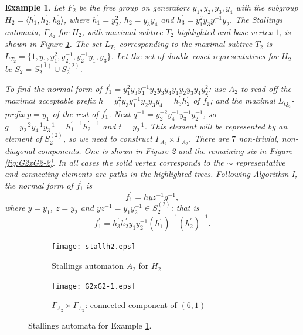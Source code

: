 \documentclass[a4paper,12pt]{article}
\newcommand{\G}{\Gamma }
\newtheorem{exam}[theorem]{Example}
\newenvironment{example}{\begin{exam} \rm}{\end{exam}}
\numberwithin{equation}{section}
\numberwithin{figure}{section}
\newcommand{\la}{\langle}
\newcommand{\ra}{\rangle}
\begin{document}
\begin{example}\label{ex:f_2}
Let $F_2$ be the free group on generators
$y_1,y_2,y_3,y_4$ with the subgroup $H_2 = \la h_1^{\prime},
h_2^{\prime},h_3^{\prime}\ra$, where
$h_1^{\prime}=y_2^2$,
$h_2^{\prime}=y_3y_4$ and
$h_3^{\prime}=y_1^2y_3y_1^{-1}y_2$.
The Stallings automata, $\G_{A_2}$ for $H_2$,
with maximal subtree $T_2$ highlighted and base vertex $1$, is shown
in Figure \ref{fig:stallh2}.
The set $L_{T_2}$ corresponding to the maximal subtree  $T_2$ is
 $L_{T_2}=
\{1, y_1, y_1^2,
y_2^{-1}, y_2^{-1}y_1, y_3 \}$.
Let the set of double coset representatives for $H_2$ be $S_2=S_2^{(1)}
\cup S_2^{(2)}$.

To find the normal form of $f_1^\prime=y_1^2y_3y_1^{-1}y_2y_3y_4y_1y_2
y_3y_4y_2^2$: use ${A_2}$ to read off the maximal acceptable
prefix $h= y_1^2y_3y_1^{-1}y_2y_3y_4=h_3^\prime h_2^\prime$ of $f_1^\prime$; and  the maximal
$L_{Q_2}$-prefix $p=y_1$ of the rest of $f_1^\prime$.  Next $q^{-1}=
y_2^{-2}y_4^{-1}y_3^{-1}y_2^{-1}$, so $g=y_2^{-2}y_4^{-1}y_3^{-1}
=h_1^{\prime -1}h_2^{\prime -1}$
and $t=y_2^{-1}$. This element will be represented by an element
of $S_2^{(2)}$, so we need to construct $\G_{A_2}\times \G_{A_2}$.
There are $7$  non-trivial, non-diagonal components. One is shown
in Figure \ref{fig:G2xG2-1} and the remaining
six in Figure \ref{fig:G2xG2-2}. In all cases the solid vertex
corresponds to the $\sim$ representative and connecting elements
are paths in the highlighted trees. Following Algorithm I, the
normal form of $f_1^\prime$ is
\[f_1^\prime=h yz^{-1} g^{-1},\]
where $y=y_1$, $z=y_2$ and $yz^{-1}=y_1y_2^{-1}\in S_2^{(2)}$: that is
\[f_1^\prime=h^\prime_3h_2^\prime y_1y_2^{-1} (h_1^\prime)^{-1}(h_2^\prime)^{-1}.\]
\end{example}
\begin{figure}
\begin{center}




\begin{subfigure}[b]{.3\columnwidth}
\texttt{[image: stallh2.eps]}
\caption{Stallings automaton $A_2$ for $H_2$}
\label{fig:stallh2}
\end{subfigure}
\hspace{25mm}
\begin{subfigure}[b]{.3\columnwidth}
\texttt{[image: G2xG2-1.eps]}
\caption{$\G_{A_2}\times \G_{A_2}$: connected component of $(6,1)$}
\label{fig:G2xG2-1}
\end{subfigure}
\end{center}
\caption{Stallings automata for Example \ref{ex:f_2}.}\label{fig:stallagain}
\end{figure}
\end{document}
